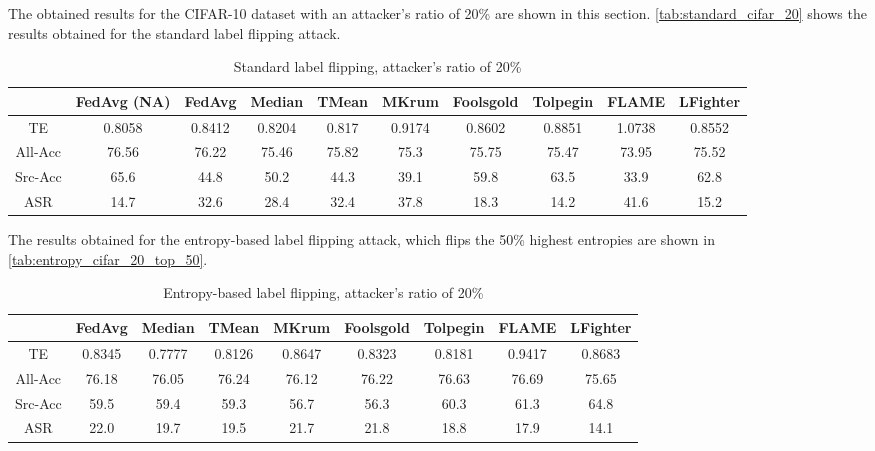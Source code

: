 The obtained results for the CIFAR-10 dataset with an attacker's ratio of 20\% are shown in this section.
\autoref{tab:standard_cifar_20} shows the results obtained for the standard label flipping attack.

\begin{table}[h!]
        \centering
        \small
        \begin{adjustbox}{center}
        \begin{tabular}{|c|c|c|c|c|c|c|c|c|c|}
                \hline
                & FedAvg (NA) & FedAvg & Median & TMean & MKrum & Foolsgold & Tolpegin & FLAME & LFighter \\
                \hline
                TE & 0.8058 & 0.8412 & 0.8204 & 0.817 & 0.9174 & 0.8602 & 0.8851 & 1.0738 & 0.8552 \\
                \hline
                All-Acc & 76.56 & 76.22 & 75.46 & 75.82 & 75.3 & 75.75 & 75.47 & 73.95 & 75.52 \\
                \hline
                Src-Acc & 65.6 & 44.8 & 50.2 & 44.3 & 39.1 & 59.8 & 63.5 & 33.9 & 62.8 \\
                \hline
                ASR & 14.7 & 32.6 & 28.4 & 32.4 & 37.8 & 18.3 & 14.2 & 41.6 & 15.2 \\
                \hline
        \end{tabular}
        \end{adjustbox}
        \caption{Standard label flipping, attacker's ratio of 20\%}
        \label{tab:standard_cifar_20}
    \end{table}
    
The results obtained for the entropy-based label flipping attack, which flips the 50\% highest entropies are shown in \autoref{tab:entropy_cifar_20_top_50}.

\begin{table}[h!]
        \centering
        \small
        \begin{adjustbox}{center}
        \begin{tabular}{|c|c|c|c|c|c|c|c|c|}
            \hline
            & FedAvg & Median & TMean & MKrum & Foolsgold & Tolpegin & FLAME & LFighter \\
            \hline
            TE & 0.8345 & 0.7777 & 0.8126 & 0.8647 & 0.8323 & 0.8181 & 0.9417 & 0.8683 \\
            \hline
            All-Acc & 76.18 & 76.05 & 76.24 & 76.12 & 76.22 & 76.63 & 76.69 & 75.65 \\
            \hline
            Src-Acc & 59.5 & 59.4 & 59.3 & 56.7 & 56.3 & 60.3 & 61.3 & 64.8 \\
            \hline
            ASR & 22.0 & 19.7 & 19.5 & 21.7 & 21.8 & 18.8 & 17.9 & 14.1 \\
            \hline
        \end{tabular}
        \end{adjustbox}
        \caption{Entropy-based label flipping, attacker's ratio of 20\%}
        \label{tab:entropy_cifar_20_top_50}
    \end{table}
    

